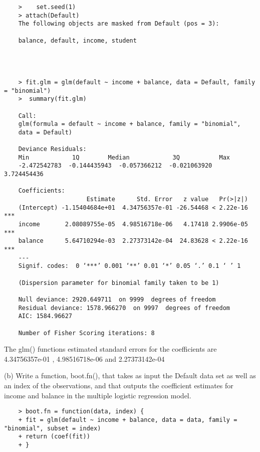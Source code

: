 \documentclass{article}
\begin{document}
\begin{program}
	\begin{verbatim}
	> 	 set.seed(1)
	> attach(Default)
	The following objects are masked from Default (pos = 3):
	
	balance, default, income, student
	
	
	
	
	> fit.glm = glm(default ~ income + balance, data = Default, family = "binomial")
	>  summary(fit.glm)

	Call:
	glm(formula = default ~ income + balance, family = "binomial", 
	data = Default)
	
	Deviance Residuals: 
	Min            1Q        Median            3Q           Max  
	-2.472542783  -0.144435943  -0.057366212  -0.021063920   3.724454436  
	
	Coefficients:
	                   Estimate      Std. Error   z value   Pr(>|z|)    
	(Intercept) -1.15404684e+01  4.34756357e-01 -26.54468 < 2.22e-16 ***
	income       2.08089755e-05  4.98516718e-06   4.17418 2.9906e-05 ***
	balance      5.64710294e-03  2.27373142e-04  24.83628 < 2.22e-16 ***
	---
	Signif. codes:  0 ‘***’ 0.001 ‘**’ 0.01 ‘*’ 0.05 ‘.’ 0.1 ‘ ’ 1
	
	(Dispersion parameter for binomial family taken to be 1)
	
	Null deviance: 2920.649711  on 9999  degrees of freedom
	Residual deviance: 1578.966270  on 9997  degrees of freedom
	AIC: 1584.96627
	
	Number of Fisher Scoring iterations: 8	
	\end{verbatim}
\end{program}

The glm() functions  estimated standard errors for the coefficients are 4.34756357e-01 , 4.98516718e-06  and 2.27373142e-04

\newpage

(b) Write a function, boot.fn(), that takes as input the Default data set as well as an index of the observations, and that outputs the coefficient estimates for income and balance in the multiple logistic regression model.

\begin{program}
	\begin{verbatim}
	> boot.fn = function(data, index) {
	+ fit = glm(default ~ income + balance, data = data, family = "binomial", subset = index)
	+ return (coef(fit))
	+ }
		\end{verbatim}
\end{program}
\end{document}
